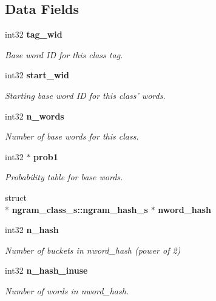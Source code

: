 \subsection*{Data Fields}
\begin{DoxyCompactItemize}
\item 
int32 {\bf tag\-\_\-wid}\label{structngram__class__s_ab5f3cc0142c9fd91b3c3d0e59906b556}

\begin{DoxyCompactList}\small\item\em Base word I\-D for this class tag. \end{DoxyCompactList}\item 
int32 {\bf start\-\_\-wid}\label{structngram__class__s_a370c88602c7c1f7e3ff1a767c027f5cb}

\begin{DoxyCompactList}\small\item\em Starting base word I\-D for this class' words. \end{DoxyCompactList}\item 
int32 {\bf n\-\_\-words}\label{structngram__class__s_af13562cbc44647435f315b18df5688dc}

\begin{DoxyCompactList}\small\item\em Number of base words for this class. \end{DoxyCompactList}\item 
int32 $\ast$ {\bf prob1}\label{structngram__class__s_a50077f48f135f1c666745a21574e4205}

\begin{DoxyCompactList}\small\item\em Probability table for base words. \end{DoxyCompactList}\item 
struct \\*
{\bf ngram\-\_\-class\-\_\-s\-::ngram\-\_\-hash\-\_\-s} $\ast$ {\bfseries nword\-\_\-hash}\label{structngram__class__s_aab28f6b41e4020455ff2484a6fa850bb}

\item 
int32 {\bf n\-\_\-hash}\label{structngram__class__s_a7f450019eb6dc2e31b18eb3ab6009920}

\begin{DoxyCompactList}\small\item\em Number of buckets in nword\-\_\-hash (power of 2) \end{DoxyCompactList}\item 
int32 {\bf n\-\_\-hash\-\_\-inuse}\label{structngram__class__s_a79438cd582363800bc05da31a9ca49d6}

\begin{DoxyCompactList}\small\item\em Number of words in nword\-\_\-hash. \end{DoxyCompactList}\end{DoxyCompactItemize}


